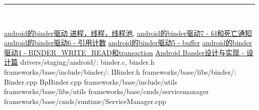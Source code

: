 \documentclass[a4paper,11pt]{article}
\begin{document}
\noindent\rule[-1ex]{\textwidth}{3pt}\\[2.0ex]
\begin{thebibliography}{Binder}
     \href{http://blog.sina.com.cn/s/blog_69f669470100s40o.html}{android的binder驱动 进程，线程，线程池},
    \bibitem {}\href{http://www.baidubuqing.com/node/244}{android的binder驱动7 - fd和死亡通知}
    \bibitem {}\href{http://www.baidubuqing.com/node/243}{android的binder驱动6 - 引用计数}
    \bibitem {}\href{http://www.baidubuqing.com/node/242}{android的binder驱动5 - buffer}
    \bibitem {}\href{http://www.baidubuqing.com/node/241}{android的binder驱动4 - BINDER_WRITE_READ和transaction}
     \href{http://blog.csdn.net/universus/article/details/6211589}{Android Bander设计与实现 - 设计篇}
    drivers/staging/android/: binder.c, binder.h
    frameworks/base/include/binder/: IBinder.h
    frameworks/base/libs/binder/:  Binder.cpp BpBinder.cpp
     frameworks/base/include/utils
     frameworks/base/libs/utils
     frameworks/base/cmds/servicemanager
     frameworks/base/cmds/runtime/ServiceManager.cpp
\end{thebibliography}
\printindex

\end{document}
